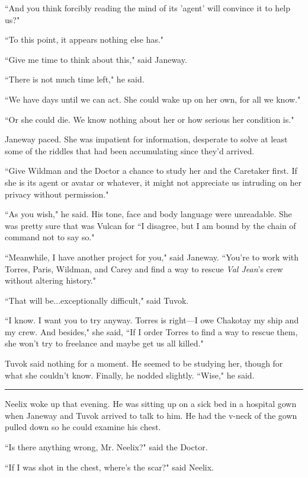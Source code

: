\documentclass[twoside,letterpaper,12pt]{memoir}
\begin{document}
``And you think forcibly reading the mind of its 'agent' will convince it to help us?" 

``To this point, it appears nothing else has." 

``Give me time to think about this," said Janeway. 

``There is not much time left," he said. 

``We have days until we can act. She could wake up on her own, for all we know." 

``Or she could die. We know nothing about her or how serious her condition is." 

Janeway paced. She was impatient for information, desperate to solve at least some of the riddles that had been accumulating since they'd arrived. 

``Give Wildman and the Doctor a chance to study her and the Caretaker first. If she is its agent or avatar or whatever, it might not appreciate us intruding on her privacy without permission." 

``As you wish," he said. His tone, face and body language were unreadable. She was pretty sure that was Vulcan for ``I disagree, but I am bound by the chain of command not to say so." 

``Meanwhile, I have another project for you," said Janeway. ``You're to work with Torres, Paris, Wildman, and Carey and find a way to rescue \textit{Val Jean}'s crew without altering history." 

``That will be...exceptionally difficult," said Tuvok. 

``I know. I want you to try anyway. Torres is right---I owe Chakotay my ship and my crew. And besides," she said, ``If I order Torres to find a way to rescue them, she won't try to freelance and maybe get us all killed." 

Tuvok said nothing for a moment. He seemed to be studying her, though for what she couldn't know. Finally, he nodded slightly. ``Wise," he said. 

\begin{center}\rule{3cm}{0.4 pt}\end{center} 

Neelix woke up that evening. He was sitting up on a sick bed in a hospital gown when Janeway and Tuvok arrived to talk to him. He had the v-neck of the gown pulled down so he could examine his chest. 

``Is there anything wrong, Mr. Neelix?" said the Doctor. 

``If I was shot in the chest, where's the scar?" said Neelix. 
\end{document}
